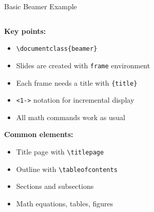 \begin{frame}[fragile]{Basic Beamer Example}
\begin{columns}
                         \begin{column}{0.5\textwidth}
                              \textbf{Key points:}
                              \begin{itemize}
                                   \item \texttt{\textbackslash documentclass\{beamer\}}
                                   \item Slides are created with \texttt{frame} environment
                                   \item Each frame needs a title with \texttt{\{title\}}
                                   \item \texttt{<1->} notation for incremental display
                                   \item All math commands work as usual
                              \end{itemize}
                              
                              \textbf{Common elements:}
                              \begin{itemize}
                                   \item Title page with \texttt{\textbackslash titlepage}
                                   \item Outline with \texttt{\textbackslash tableofcontents}
                                   \item Sections and subsections
                                   \item Math equations, tables, figures
                              \end{itemize}
                              
                              
                         \end{column}
                    \end{columns}
               \end{frame}
               
